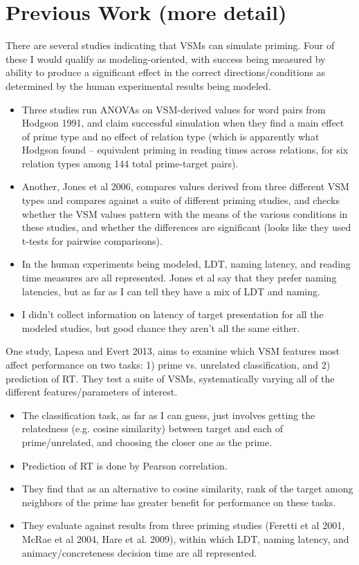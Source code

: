 \documentclass{article}
\begin{document}
\section{Previous Work (more detail)}\label{prev}
There are several studies indicating that VSMs can simulate priming. Four of these I would qualify as modeling-oriented, with success being measured by ability to produce a significant effect in the correct directions/conditions as determined by the human experimental results being modeled.
\begin{itemize}
\item Three studies run ANOVAs on VSM-derived values for word pairs from Hodgson 1991, and claim successful simulation when they find a main effect of prime type and no effect of relation type (which is apparently what Hodgson found -- equivalent priming in reading times across relations, for six relation types among 144 total prime-target pairs).  
\item Another, Jones et al 2006, compares values derived from three different VSM types and compares against a suite of different priming studies, and checks whether the VSM values pattern with the means of the various conditions in these studies, and whether the differences are significant (looks like they used t-tests for pairwise comparisons).  
\item In the human experiments being modeled, LDT, naming latency, and reading time measures are all represented. Jones et al say that they prefer naming latencies, but as far as I can tell they have a mix of LDT and naming. 
\item I didn't collect information on latency of target presentation for all the modeled studies, but good chance they aren't all the same either. 
\end{itemize}
One study, Lapesa and Evert 2013, aims to examine which VSM features most affect performance on two tasks: 1) prime vs. unrelated classification, and 2) prediction of RT. They test a suite of VSMs, systematically varying all of the different features/parameters of interest. 
\begin{itemize}
\item The classification task, as far as I can guess, just involves getting the relatedness (e.g. cosine similarity) between target and each of prime/unrelated, and choosing the closer one as the prime. 
\item Prediction of RT is done by Pearson correlation. 
\item They find that as an alternative to cosine similarity, rank of the target among neighbors of the prime has greater benefit for performance on these tasks. 
\item They evaluate against results from three priming studies (Feretti et al 2001, McRae et al 2004, Hare et al. 2009), within which LDT, naming latency, and animacy/concreteness decision time are all represented. 
\end{itemize}
\end{document}
